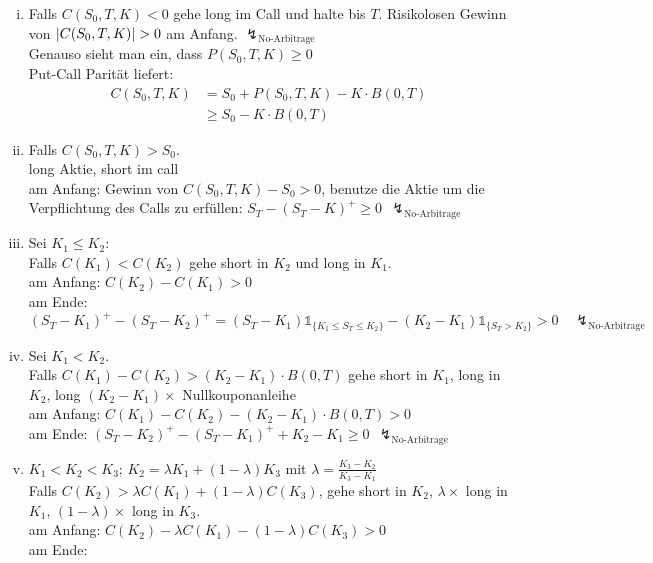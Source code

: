 \begin{enumerate}[(i)]
	\item Falls $C(S_0,T,K) < 0$ gehe long im Call und halte bis $T$. Risikolosen Gewinn von $\left\vert C(S_0,T,K)\right\vert> 0$ am Anfang. $\lightning_{\text{No-Arbitrage}}$\\
	Genauso sieht man ein, dass $P(S_0,T,K)\ge 0$\\
	Put-Call Parität liefert:
	\begin{equation*}
		\begin{aligned}
			C(S_0,T,K)&=S_0 + P(S_0,T,K)-K\cdot B(0,T)\\
			&\ge S_0 - K\cdot B(0,T)
		\end{aligned}
	\end{equation*}
	\item  Falls $C(S_0,T,K) >S_0$.\\
	long Aktie, short im call\\
	am Anfang: Gewinn von $C(S_0,T,K) -S_0>0$, benutze die Aktie um die Verpflichtung des Calls zu erfüllen: $S_T - (S_T-K)^+ \ge 0~~\lightning_{\text{No-Arbitrage}}$
	\item Sei $K_1 \le K_2$:\\
	Falls $C(K_1)<C(K_2)$ gehe  short in $K_2$ und long in $K_1$.\\
	am Anfang: $C(K_2) - C(K_1) > 0$\\
	am Ende: 
	\[
	(S_T-K_1)^+ -(S_T-K_2)^+ = (S_T-K_1)\mathbb{1}_{\{K_1\le S_T\le K_2\}}-(K_2-K_1)\mathbb{1}_{\{S_T>K_2\}}>0\quad \lightning_{\text{No-Arbitrage}}
	\]
	\item Sei $K_1<K_2$.\\
	Falls $C(K_1)-C(K_2)>(K_2-K_1)\cdot B(0,T)$ gehe short in $K_1$, long in $K_2$, long $(K_2-K_1)\times$ Nullkouponanleihe\\ 
	am Anfang: $C(K_1)-C(K_2)-(K_2-K_1)\cdot B(0,T)>0$\\
	am Ende: $(S_T-K_2)^+ -(S_T-K_1)^+ +K_2-K_1 \ge 0~~ \lightning_{\text{No-Arbitrage}}$
	\item $K_1<K_2<K_3$; $K_2=\lambda K_1+(1-\lambda)K_3$ mit $\lambda=\frac{K_3-K_2}{K_3-K_1}$\\
	Falls $C(K_2)> \lambda C(K_1)+ (1-\lambda)C(K_3)$, gehe short in $K_2$, $\lambda \times$ long in $K_1$, $(1-\lambda) \times$ long in $K_3$.\\
	am Anfang: $C(K_2)-\lambda C(K_1)-(1-\lambda)C(K_3)>0$\\
	am Ende: 
	\begin{equation*}
	\begin{aligned}

\end{aligned}
\end{equation*}
\end{enumerate}
